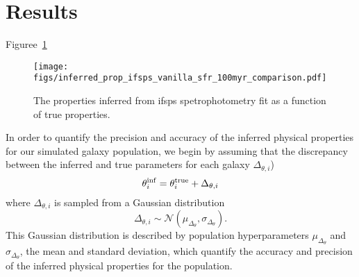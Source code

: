 \section{Results} \label{sec:results}
Figuree~\ref{fig:prop_inf} 

\begin{figure}
\begin{center}
\texttt{[image: figs/inferred\_prop\_ifsps\_vanilla\_sfr\_100myr\_comparison.pdf]}
\caption{The properties inferred from ifsps spetrophotometry fit as a function of true properties. 
}
\label{fig:prop_inf}
\end{center}
\end{figure}

In order to quantify the precision and accuracy of the inferred physical
properties for our simulated galaxy population, we begin by assuming that the
discrepancy between the inferred and true parameters for each galaxy 
$\Delta_{\theta,i}$) 
\begin{equation}
    \theta^{\rm inf}_i = \theta^{\rm true}_i + \Delta_{\theta,i}
\end{equation}
where $\Delta_{\theta,i}$ is sampled from a Gaussian distribution
\begin{equation}
    \Delta_{\theta,i} \sim \mathcal{N}(\mu_{\Delta_{\theta}}, \sigma_{\Delta_{\theta}}).
\end{equation}
This Gaussian distribution is described by population hyperparameters $\mu_{\Delta_{\theta}}$ and 
$\sigma_{\Delta_{\theta}}$, the mean and standard deviation, which quantify the accuracy and 
precision of the inferred physical properties for the population. 

